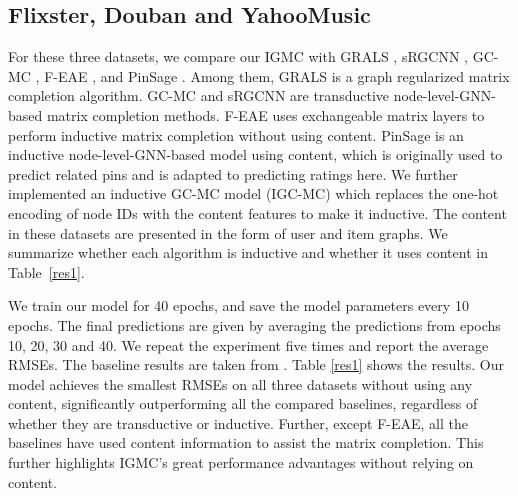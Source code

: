 \documentclass{article} \usepackage{iclr2020_conference,times}
\begin{document}
\subsection{Flixster, Douban and YahooMusic}
For these three datasets, we compare our IGMC with GRALS \citep{rao2015collaborative}, sRGCNN \citep{monti2017geometric}, GC-MC \citep{berg2017graph}, F-EAE \citep{hartford2018deep}, and PinSage \citep{ying2018graph}. Among them, GRALS is a graph regularized matrix completion algorithm. GC-MC and sRGCNN are transductive node-level-GNN-based matrix completion methods. F-EAE uses exchangeable matrix layers to perform inductive matrix completion without using content. PinSage is an inductive node-level-GNN-based model using content, which is originally used to predict related pins and is adapted to predicting ratings here. We further implemented an inductive GC-MC model (IGC-MC) which replaces the one-hot encoding of node IDs with the content features to make it inductive. The content in these datasets are presented in the form of user and item graphs. We summarize whether each algorithm is inductive and whether it uses content in Table~\ref{res1}.

We train our model for 40 epochs, and save the model parameters every 10 epochs. The final predictions are given by averaging the predictions from epochs 10, 20, 30 and 40. We repeat the experiment five times and report the average RMSEs. The baseline results are taken from \citep{hartford2018deep}. Table \ref{res1} shows the results. Our model achieves the smallest RMSEs on all three datasets without using any content, significantly outperforming all the compared baselines, regardless of whether they are transductive or inductive. Further, except F-EAE, all the baselines have used content information to assist the matrix completion. 
This further highlights IGMC's great performance advantages without relying on content.
\end{document}
